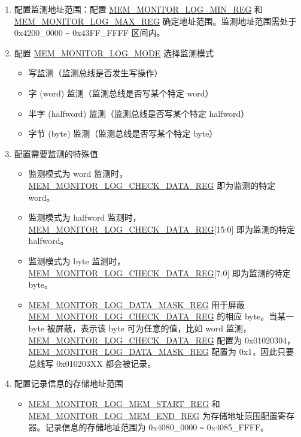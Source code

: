 \documentclass[main\_\_CN.tex]{subfiles}
\begin{document}
\begin{enumerate}
    \item 配置监测地址范围：配置 \hyperref[regdesc:MEMMONITORLOGMINREG]{MEM\_MONITOR\_LOG\_MIN\_REG} 和 \hyperref[regdesc:MEMMONITORLOGMAXREG]{MEM\_MONITOR\_LOG\_MAX\_REG} 确定地址范围。监测地址范围需处于 0x4200\_0000 \verb+~+ 0x43FF\_FFFF 区间内。
    \item 配置 \hyperref[fielddesc:MEMMONITORLOGMODE]{MEM\_MONITOR\_LOG\_MODE} 选择监测模式
       \begin{itemize}
           \item 写监测（监测总线是否发生写操作）
           \item 字 (word) 监测（监测总线是否写某个特定 word）
           \item 半字 (halfword) 监测（监测总线是否写某个特定 halfword）
           \item 字节 (byte) 监测（监测总线是否写某个特定 byte）
       \end{itemize}
    \item 配置需要监测的特殊值
        \begin{itemize}
            \item 监测模式为 word 监测时，\hyperref[regdesc:MEMMONITORLOGCHECKDATAREG]{MEM\_MONITOR\_LOG\_CHECK\_DATA\_REG} 即为监测的特定 word。
            \item 监测模式为 halfword 监测时，\hyperref[regdesc:MEMMONITORLOGCHECKDATAREG]{MEM\_MONITOR\_LOG\_CHECK\_DATA\_REG}[15:0] 即为监测的特定 halfword。
            \item 监测模式为 byte 监测时，\hyperref[regdesc:MEMMONITORLOGCHECKDATAREG]{MEM\_MONITOR\_LOG\_CHECK\_DATA\_REG}[7:0] 即为监测的特定 byte。
            \item \hyperref[regdesc:MEMMONITORLOGDATAMASKREG]{MEM\_MONITOR\_LOG\_DATA\_MASK\_REG} 用于屏蔽 \hyperref[regdesc:MEMMONITORLOGCHECKDATAREG]{MEM\_MONITOR\_LOG\_CHECK\_DATA\_REG} 的相应 byte。当某一 byte 被屏蔽，表示该 byte 可为任意的值，比如 word 监测，\hyperref[regdesc:MEMMONITORLOGCHECKDATAREG]{MEM\_MONITOR\_LOG\_CHECK\_DATA\_REG} 配置为 0x01020304，\hyperref[regdesc:MEMMONITORLOGDATAMASKREG]{MEM\_MONITOR\_LOG\_DATA\_MASK\_REG} 配置为 0x1，因此只要总线写 0x010203XX 都会被记录。
        \end{itemize}
    \item 配置记录信息的存储地址范围
        \begin{itemize}
            \item \hyperref[regdesc:MEMMONITORLOGMEMSTARTREG]{MEM\_MONITOR\_LOG\_MEM\_START\_REG} 和 \hyperref[regdesc:MEMMONITORLOGMEMENDREG]{MEM\_MONITOR\_LOG\_MEM\_END\_REG} 为存储地址范围配置寄存器。记录信息的存储地址范围为 0x4080\_0000 \verb+~+ 0x4085\_FFFF。

\end{itemize}
\end{enumerate}
\end{document}
